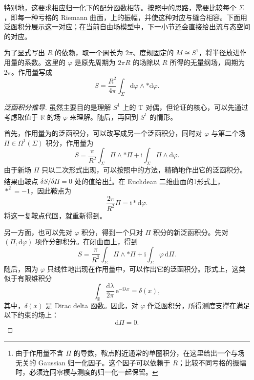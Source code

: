 特别地，这要求相应归一化下的配分函数相等。按照中的思路，需要比较每个 $\Sigma$，即每一种亏格的 Riemann 曲面，上的振幅，并使这种对应与缝合相容。下面用泛函积分展示这一对应；在当前自由场模型中，下一小节还会直接给出流与态空间的对应。

为了显式写出 $R$ 的依赖，取一个周长为 $2\pi$、度规固定的 $M\cong S^1$，将半径放进作用量的系数。这里的 $\varphi$ 是原先周期为 $2\pi R$ 的场除以 $R$ 所得的无量纲场，周期为 $2\pi$。作用量写成
\begin{equation}\label{eq:3.59}
S=\frac{R^2}{4\pi}\int_\Sigma
\mathrm{d}\varphi\wedge*\mathrm{d}\varphi.
\end{equation}

\begin{proof}[泛函积分推导]
虽然主要目的是理解 $S^1$ 上的 T 对偶，但论证的核心，可以先通过考虑取值于 $\mathbb{R}$ 的场 $\varphi$ 来理解。随后，再回到 $S^1$ 的情形。

首先，作用量为的泛函积分，可以改写成另一个泛函积分，同时对 $\varphi$ 与第二个场 $\Pi\in\Omega^1(\Sigma)$ 积分，作用量为
\begin{equation}\label{eq:3.60}
S=\frac{\pi}{R^2}\int_\Sigma\Pi\wedge*\Pi
+\mathrm{i}\int_\Sigma\Pi\wedge\mathrm{d}\varphi.
\end{equation}
由于新场 $\Pi$ 只以二次形式出现，可以按照中的方法，精确地作出它的泛函积分。结果由鞍点 $\delta S/\delta\Pi=0$ 处的值给出\footnote{由于作用量不含 $\Pi$ 的导数，鞍点附近通常的单圈积分，在这里给出一个与场无关的 Gaussian 归一化因子。这个因子可以依赖于 $R$；比较不同亏格的振幅时，必须连同零模与测度的归一化一起保留。}。在 Euclidean 二维曲面的1形式上，$*^2=-1$，因此鞍点为
\begin{equation}\label{eq:3.61}
\frac{2\pi}{R^2}\Pi=\mathrm{i}*\mathrm{d}\varphi.
\end{equation}
将这一复鞍点代回，就重新得到。

另一方面，也可以先对 $\varphi$ 积分，得到一个只对 $\Pi$ 积分的新泛函积分。先对 $(\Pi,\mathrm{d}\varphi)$ 项作分部积分。在闭曲面上，得到
\[
S=\frac{\pi}{R^2}\int_\Sigma\Pi\wedge*\Pi
+\mathrm{i}\int_\Sigma\varphi\,\mathrm{d}\Pi.
\]
随后，因为 $\varphi$ 只线性地出现在作用量中，可以作出它的泛函积分。形式上，这类似于有限维积分
\[
\int_{\mathbb{R}}\frac{\mathrm{d}\lambda}{2\pi}
\,\mathrm{e}^{-\mathrm{i}\lambda x}=\delta(x),
\]
其中，$\delta(x)$ 是 Dirac delta 函数。因此，对 $\varphi$ 作泛函积分，所得测度支撑在满足以下约束的场上：
\begin{equation}\label{eq:3.62}
\mathrm{d}\Pi=0.
\end{equation}


\end{proof}
